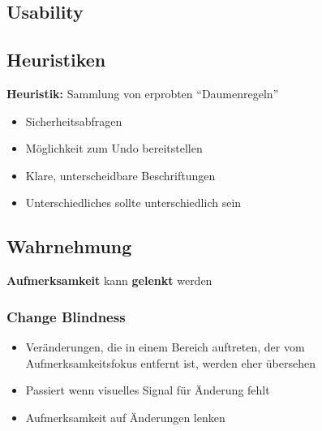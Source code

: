 \documentclass[a4paper, landscape, 8pt]{scrartcl}
\begin{document}
\begin{multicols*}{4}
        \section{Usability}
        \subsection{Heuristiken}
        \textbf{Heuristik:} Sammlung von erprobten \enquote{Daumenregeln}
        \begin{itemize}
            \item Sicherheitsabfragen
            \item Möglichkeit zum Undo bereitstellen
            \item Klare, unterscheidbare Beschriftungen
            \item Unterschiedliches sollte unterschiedlich sein
        \end{itemize}

        \subsection{Wahrnehmung}
        \textbf{Aufmerksamkeit} kann \textbf{gelenkt} werden

        \subsubsection{Change Blindness}
        \begin{itemize}
            \item Veränderungen, die in einem Bereich auftreten, der vom Aufmerksamkeitsfokus entfernt ist, werden eher übersehen
            \item Passiert wenn visuelles Signal für Änderung fehlt
            \item Aufmerksamkeit auf Änderungen lenken
        \end{itemize}


\end{multicols*}
\end{document}
